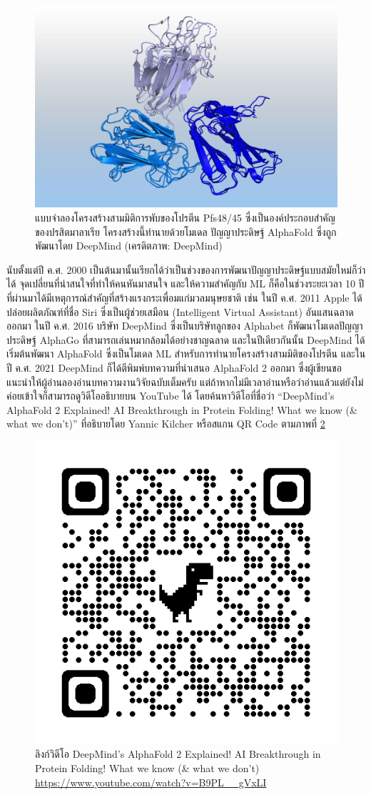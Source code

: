 \begin{figure}[htbp]
    \centering
    \includegraphics[width=\linewidth]{fig/malaria-parasite-protein-deepmind.jpeg}
    \caption{แบบจำลองโครงสร้างสามมิติการพับของโปรตีน Pfs48/45 ซึ่งเป็นองค์ประกอบสำคัญของปรสิตมาลาเรีย โครงสร้างนี้ทำนายด้วยโมเดล 
    ปัญญาประดิษฐ์ AlphaFold ซึ่งถูกพัฒนาโดย DeepMind (เครดิตภาพ: DeepMind)}
    \label{fig:malaria_parasite}
\end{figure}

นับตั้งแต่ปี ค.ศ. 2000 เป็นต้นมานั้นเรียกได้ว่าเป็นช่วงของการพัฒนาปัญญาประดิษฐ์แบบสมัยใหม่ก็ว่าได้ จุดเปลี่ยนที่น่าสนใจที่ทำให้คนหันมาสนใจ%
และให้ความสำคัญกับ ML ก็คือในช่วงระยะเวลา 10 ปีที่ผ่านมาได้มีเหตุการณ์สำคัญที่สร้างแรงกระเพื่อมแก่มวลมนุษยชาติ เช่น ในปี ค.ศ. 2011 
Apple ได้ปล่อยผลิตภัณฑ์ที่ชื่อ Siri ซึ่งเป็นผู้ช่วยเสมือน (Intelligent Virtual Assistant) อันแสนฉลาดออกมา ในปี ค.ศ. 2016 บริษัท 
DeepMind ซึ่งเป็นบริษัทลูกของ Alphabet ก็พัฒนาโมเดลปัญญาประดิษฐ์ AlphaGo ที่สามารถเล่นหมากล้อมได้อย่างชาญฉลาด และในปีเดียวกันนั้น 
DeepMind ได้เริ่มต้นพัฒนา AlphaFold ซึ่งเป็นโมเดล ML สำหรับการทำนายโครงสร้างสามมิติของโปรตีน และในปี ค.ศ. 2021 DeepMind 
ก็ได้ตีพิมพ์บทความที่นำเสนอ AlphaFold 2 ออกมา\autocite{jumper2021} ซึ่งผู้เขียนขอแนะนำให้ผู้อ่านลองอ่านบทความงานวิจัยฉบับเต็มครับ 
แต่ถ้าหากไม่มีเวลาอ่านหรือว่าอ่านแล้วแต่ยังไม่ค่อยเข้าใจก็สามารถดูวิดีโออธิบายบน YouTube ได้ โดยค้นหาวิดีโอที่ชื่อว่า 
\enquote{DeepMind's AlphaFold 2 Explained! AI Breakthrough in Protein Folding! What we know (\& what we don't)} 
ที่อธิบายโดย Yannic Kilcher หรือสแกน QR Code ตามภาพที่ \ref{fig:qr_code_alphafold}

\begin{figure}[htbp]
    \centering
    \includegraphics[width=0.3\linewidth]{fig/qr_code_alphafold2_explained.png}
    \caption{ลิงก์วิดีโอ DeepMind's AlphaFold 2 Explained! AI Breakthrough in Protein Folding! What we know 
    (\& what we don't) \url{https://www.youtube.com/watch?v=B9PL__gVxLI}}
    \label{fig:qr_code_alphafold}
\end{figure}

